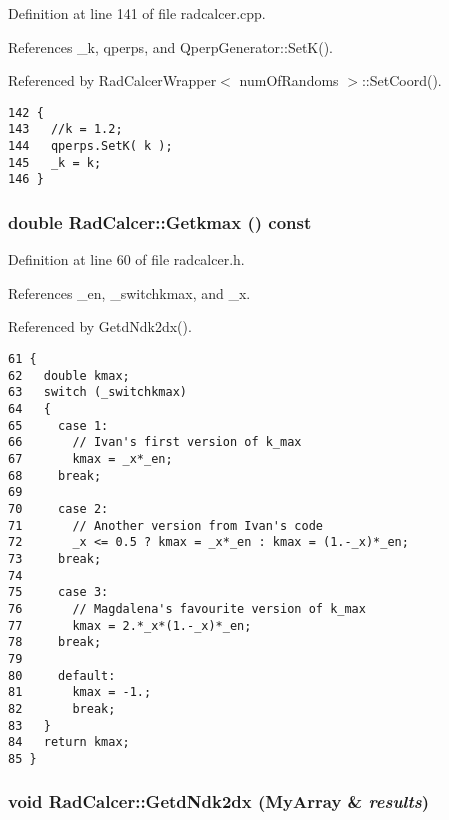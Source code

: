 Definition at line 141 of file radcalcer.cpp.

References \_\-k, qperps, and QperpGenerator::SetK().

Referenced by RadCalcerWrapper$<$ numOfRandoms $>$::SetCoord().

\begin{Code}\begin{verbatim}142 {
143   //k = 1.2;
144   qperps.SetK( k );
145   _k = k;
146 }
\end{verbatim}
\end{Code}


\subsubsection{\setlength{\rightskip}{0pt plus 5cm}double RadCalcer::Getkmax () const\hspace{0.3cm}{\tt  [inline]}}\label{classRadCalcer_2491363d38e009c91908bd78998acfbb}




Definition at line 60 of file radcalcer.h.

References \_\-en, \_\-switchkmax, and \_\-x.

Referenced by GetdNdk2dx().

\begin{Code}\begin{verbatim}61 {
62   double kmax;
63   switch (_switchkmax)
64   {
65     case 1:
66       // Ivan's first version of k_max
67       kmax = _x*_en;
68     break;
69 
70     case 2:
71       // Another version from Ivan's code
72       _x <= 0.5 ? kmax = _x*_en : kmax = (1.-_x)*_en;
73     break;
74 
75     case 3:
76       // Magdalena's favourite version of k_max
77       kmax = 2.*_x*(1.-_x)*_en;
78     break;
79 
80     default:
81       kmax = -1.;
82       break;
83   }
84   return kmax;
85 }
\end{verbatim}
\end{Code}


\subsubsection{\setlength{\rightskip}{0pt plus 5cm}void RadCalcer::GetdNdk2dx (MyArray \& {\em results})}\label{classRadCalcer_ccc5f82826c691219a05e4cb277bcc45}





